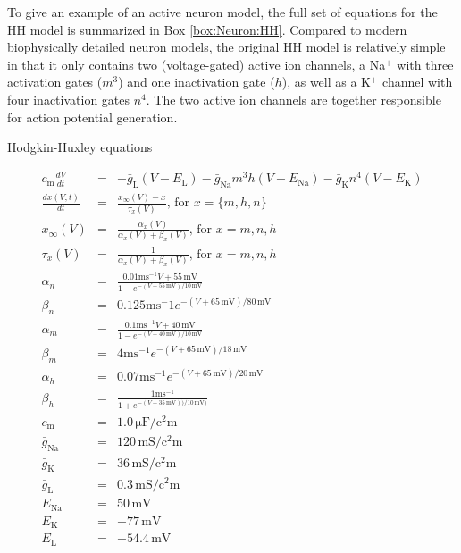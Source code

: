 To give an example of an active neuron model, the full set of equations for the HH model is summarized in Box \ref{box:Neuron:HH}. Compared to modern biophysically detailed neuron models, the original HH model is relatively simple in that it only contains two (voltage-gated) active ion channels, a Na$^+$ with three activation gates ($m^3$) and one inactivation gate ($h$), as well as a K$^+$ channel with four inactivation gates $n^4$. The two active ion channels are together responsible for action potential generation.  

\begin{floatingbox}[h]
\caption{Hodgkin-Huxley equations}

\begin{eqnarray*}
    c_{\mathrm{m}} \frac{dV}{dt} & =  & -\bar{g}_{\mathrm{L}}(V-E_{\mathrm{L}}) - \bar{g}_{\mathrm{Na}} m^3 h (V - E_{\mathrm{Na}}) - \bar{g}_{\mathrm{K}} n^4 (V - E_{\mathrm{K}}) \\
    \frac{dx(V,t)}{dt} & = & \frac{x_{\infty}(V) - x}{\tau_x(V)},  \, \text{for } x = \{m,h,n\} \\ 
    x_{\infty}(V) &= & \frac{\alpha_x(V)}{\alpha_x(V) + \beta_x(V)}, \, \text{for } x = m,n,h \\ %
    \tau_x(V) & = & \frac{1}{\alpha_x(V) + \beta_x(V)}, \, \text{for } x = m,n,h \\ %
    \alpha_n &=& \frac{0.01 \mathrm{ms}^{-1} V+55\,\si{\milli\volt}}{1-e^{-(V+55\,\si{\milli\volt})/10\,\si{\milli\volt}}}  \\ %
     \beta_n &=& 0.125 \mathrm{ms}^-1 e^{-(V+65\,\si{\milli\volt})/80\,\si{\milli\volt}}   \\ %
     \alpha_m &=& \frac{0.1 \mathrm{ms}^{-1} V+ 40\,\si{\milli\volt}} {1-e^{-(V+40\,\si{\milli\volt})/10\,\si{\milli\volt}}}  \\   
     \beta_m &=& 4 \mathrm{ms}^{-1} e^{-(V+65\,\si{\milli\volt})/18\,\si{\milli\volt}}  \\ %
    \alpha_h &=& 0.07 \mathrm{ms}^{-1} e^{-(V+65\,\si{\milli\volt})/20\,\si{\milli\volt}}  \\ %
    \beta_h &=& \frac{1 \mathrm{ms}^{-1}}{1+e^{-(V+35\,\si{\milli\volt}))/10\,\si{\milli\volt})}}   \\ %
    c_\mathrm{m} &=& 1.0 \,\si{\micro\farad\per\square\centi\metre} \\ %
    \bar{g}_{\mathrm{Na}} &=& 120 \,\si{\milli\siemens\per\square\centi\metre}\\ %
    \bar{g}_{\mathrm{K}} &=& 36 \,\si{\milli\siemens\per\square\centi\metre} \\ %
    \bar{g}_{\mathrm{L}} &=& 0.3 \,\si{\milli\siemens\per\square\centi\metre} \\ %
    E_{\mathrm{Na}} &=& 50 \,\si{\milli\volt} \\ %
    E_{\mathrm{K}} &=& -77  \,\si{\milli\volt} \\ %
    E_{\mathrm{L}} &=& -54.4 \,\si{\milli\volt} \\ %
\end{eqnarray*}
\label{box:Neuron:HH}
\end{floatingbox}



